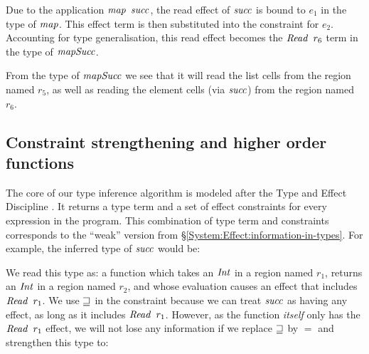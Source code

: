 
Due to the application $\imap \ \isucc$, the read effect of $\operatorname{\mathit{succ}}$ is bound to $e_1$ in the type of $\operatorname{\mathit{map}}$. This effect term is then substituted into the constraint for $e_2$. Accounting for type generalisation, this read effect becomes the $\operatorname{\mathit{Read}} \ r_6$ term in the type of $\operatorname{\mathit{mapSucc}}$.

From the type of $\operatorname{\mathit{mapSucc}}$ we see that it will read the list cells from the region named $r_5$, as well as reading the element cells (via $\operatorname{\mathit{succ}}$) from the region named $r_6$.


\subsection{Constraint strengthening and  higher order functions} 
\label{System:Effects:constraint-strengthening}
The core of our type inference algorithm is modeled after the Type and Effect Discipline \cite{talpin:discipline}. It returns a type term and a set of effect constraints for every expression in the program. This combination of type term and constraints corresponds to the ``weak'' version from \S\ref{System:Effect:information-in-types}. For example, the inferred type of $\operatorname{\mathit{succ}}$ would be: 


We read this type as: a function which takes an $\operatorname{\mathit{Int}}$ in a region named $r_1$, returns an $\operatorname{\mathit{Int}}$ in a region named $r_2$, and whose evaluation causes an effect that includes $\operatorname{\mathit{Read}} \ r_1$. We use $\sqsupseteq$ in the constraint because we can treat $\operatorname{\mathit{succ}}$ as having any effect, as long as it includes $\operatorname{\mathit{Read}} \ r_1$. However, as the function \emph{itself} only has the $\operatorname{\mathit{Read}} \ r_1$ effect, we will not lose any information if we replace $\sqsupseteq$ by $=$ and strengthen this type to:

